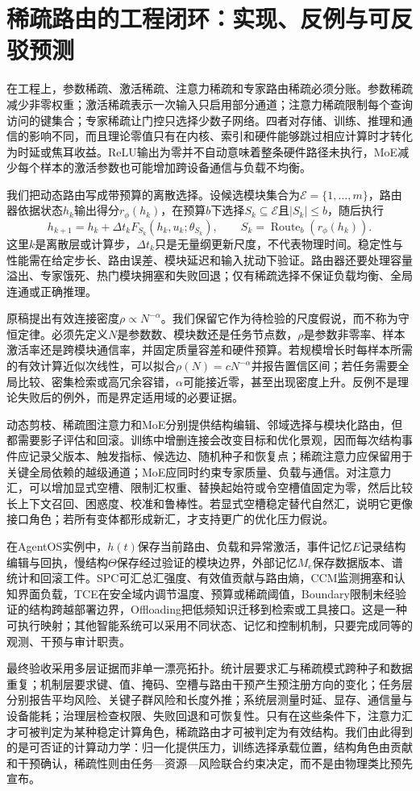 \section{稀疏路由的工程闭环：实现、反例与可反驳预测}

在工程上，参数稀疏、激活稀疏、注意力稀疏和专家路由稀疏必须分账。参数稀疏减少非零权重；激活稀疏表示一次输入只启用部分通道；注意力稀疏限制每个查询访问的键集合；专家稀疏让门控只选择少数子网络。四者对存储、训练、推理和通信的影响不同，而且理论零值只有在内核、索引和硬件能够跳过相应计算时才转化为时延或焦耳收益。ReLU输出为零并不自动意味着整条硬件路径未执行，MoE减少每个样本的激活参数也可能增加跨设备通信与负载不均衡。

我们把动态路由写成带预算的离散选择。设候选模块集合为$\mathcal{E}=\{1,\ldots,m\}$，路由器依据状态$h_k$输出得分$r_\phi(h_k)$，在预算$b$下选择$S_k\subseteq\mathcal{E}$且$|S_k|\leq b$，随后执行
\begin{equation}
 h_{k+1}=h_k+\Delta t_k F_{S_k}(h_k,u_k;\theta_{S_k}),
 \qquad S_k=\operatorname{Route}_b(r_\phi(h_k)).
\end{equation}
这里$k$是离散层或计算步，$\Delta t_k$只是无量纲更新尺度，不代表物理时间。稳定性与性能需在给定步长、路由误差、模块延迟和输入扰动下验证。路由器还要处理容量溢出、专家饿死、热门模块拥塞和失败回退；仅有稀疏选择不保证负载均衡、全局连通或正确推理。

原稿提出有效连接密度$\rho\propto N^{-\alpha}$。我们保留它作为待检验的尺度假说，而不称为守恒定律。必须先定义$N$是参数数、模块数还是任务节点数，$\rho$是参数非零率、样本激活率还是跨模块通信率，并固定质量容差和硬件预算。若规模增长时每样本所需的有效计算近似次线性，可以拟合$\rho(N)=cN^{-\alpha}$并报告置信区间；若任务需要全局比较、密集检索或高冗余容错，$\alpha$可能接近零，甚至出现密度上升。反例不是理论失败后的例外，而是界定适用域的必要证据。

动态剪枝、稀疏图注意力和MoE分别提供结构编辑、邻域选择与模块化路由，但都需要影子评估和回滚。训练中增删连接会改变目标和优化景观，因而每次结构事件应记录父版本、触发指标、候选边、随机种子和恢复点；稀疏注意力应保留用于关键全局依赖的越级通道；MoE应同时约束专家质量、负载与通信。对注意力汇，可以增加显式空槽、限制汇权重、替换起始符或令空槽值固定为零，然后比较长上下文召回、困惑度、校准和鲁棒性。若显式空槽稳定替代自然汇，说明它更像接口角色；若所有变体都形成新汇，才支持更广的优化压力假说。

在AgentOS实例中，$h(t)$保存当前路由、负载和异常激活，事件记忆$E$记录结构编辑与回执，慢结构$\Theta$保存经过验证的模块边界，外部记忆$M_e$保存数据版本、谱统计和回滚工件。SPC可汇总汇强度、有效值贡献与路由熵，CCM监测拥塞和认知界面负载，TCE在安全域内调节温度、预算或稀疏阈值，Boundary限制未经验证的结构跨越部署边界，Offloading把低频知识迁移到检索或工具接口。这是一种可执行映射；其他智能系统可以采用不同状态、记忆和控制机制，只要完成同等的观测、干预与审计职责。

最终验收采用多层证据而非单一漂亮拓扑。统计层要求汇与稀疏模式跨种子和数据重复；机制层要求键、值、掩码、空槽与路由干预产生预注册方向的变化；任务层分别报告平均风险、关键子群风险和长度外推；系统层测量时延、显存、通信量与设备能耗；治理层检查权限、失败回退和可恢复性。只有在这些条件下，注意力汇才可被判定为某种稳定计算角色，稀疏路由才可被判定为有效结构。我们由此得到的是可否证的计算动力学：归一化提供压力，训练选择承载位置，结构角色由贡献和干预确认，稀疏性则由任务—资源—风险联合约束决定，而不是由物理类比预先宣布。

